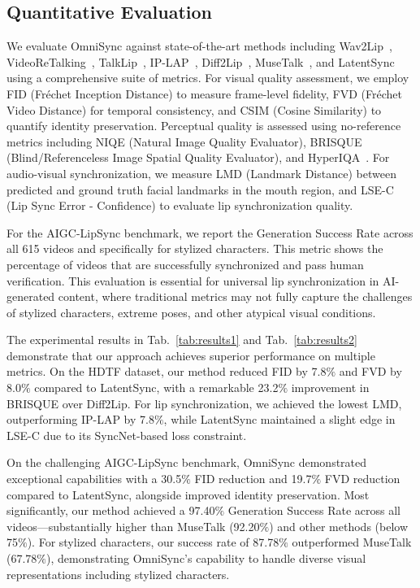 


\vspace{-0.5em}
\subsection{Quantitative Evaluation}
\vspace{-0.5em}

We evaluate OmniSync against state-of-the-art methods including Wav2Lip~\cite{prajwal2020lip}, VideoReTalking~\cite{cheng2022videoretalking}, TalkLip~\cite{wang2023seeing}, IP-LAP~\cite{zhong2023identity}, Diff2Lip~\cite{mukhopadhyay2024diff2lip}, MuseTalk~\cite{zhang2024musetalk}, and LatentSync~\cite{li2024latentsync} using a comprehensive suite of metrics. For visual quality assessment, we employ FID (Fréchet Inception Distance) to measure frame-level fidelity, FVD (Fréchet Video Distance) for temporal consistency, and CSIM (Cosine Similarity) to quantify identity preservation. Perceptual quality is assessed using no-reference metrics including NIQE (Natural Image Quality Evaluator), BRISQUE (Blind/Referenceless Image Spatial Quality Evaluator), and HyperIQA~\cite{su2020blindly}. For audio-visual synchronization, we measure LMD (Landmark Distance) between predicted and ground truth facial landmarks in the mouth region, and LSE-C (Lip Sync Error - Confidence) to evaluate lip synchronization quality.

For the AIGC-LipSync benchmark, we report the Generation Success Rate across all 615 videos and specifically for stylized characters. This metric shows the percentage of videos that are successfully synchronized and pass human verification. This evaluation is essential for universal lip synchronization in AI-generated content, where traditional metrics may not fully capture the challenges of stylized characters, extreme poses, and other atypical visual conditions.


The experimental results in Tab.~\ref{tab:results1} and Tab.~\ref{tab:results2} demonstrate that our approach achieves superior performance on multiple metrics. On the HDTF dataset, our method reduced FID by 7.8$\%$ and FVD by 8.0$\%$ compared to LatentSync, with a remarkable 23.2$\%$ improvement in BRISQUE over Diff2Lip. For lip synchronization, we achieved the lowest LMD, outperforming IP-LAP by 7.8$\%$, while LatentSync maintained a slight edge in LSE-C due to its SyncNet-based loss constraint.

On the challenging AIGC-LipSync benchmark, OmniSync demonstrated exceptional capabilities with a 30.5$\%$ FID reduction and 19.7$\%$ FVD reduction compared to LatentSync, alongside improved identity preservation. Most significantly, our method achieved a 97.40$\%$ Generation Success Rate across all videos—substantially higher than MuseTalk (92.20$\%$) and other methods (below 75$\%$). For stylized characters, our success rate of 87.78$\%$ outperformed MuseTalk (67.78$\%$), demonstrating OmniSync's capability to handle diverse visual representations including stylized characters.

